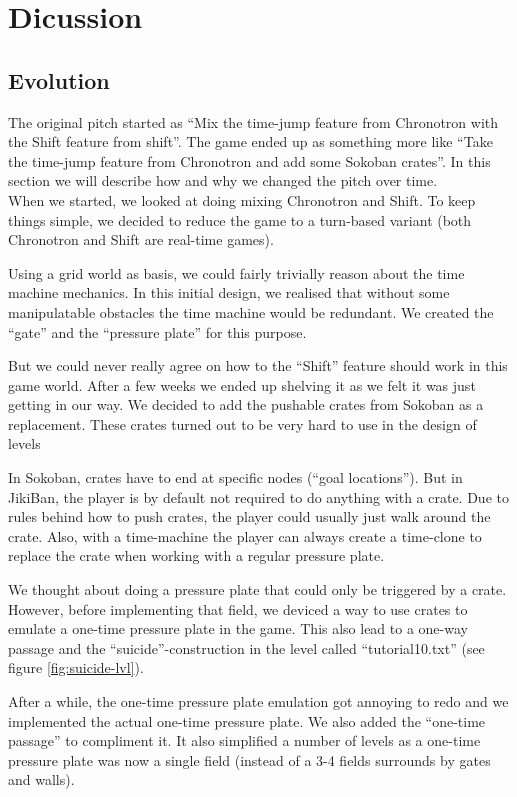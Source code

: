 \section{Dicussion}

\subsection{Evolution}
The original pitch started as ``Mix the time-jump feature from
Chronotron with the Shift feature from shift''.  The game ended up as
something more like ``Take the time-jump feature from Chronotron and
add some Sokoban crates''.  In this section we will describe how and why
we changed the pitch over time.\\


When we started, we looked at doing mixing Chronotron and Shift.  To
keep things simple, we decided to reduce the game to a turn-based
variant (both Chronotron and Shift are real-time games).

Using a grid world as basis, we could fairly trivially reason about
the time machine mechanics.  In this initial design, we realised that
without some manipulatable obstacles the time machine would be
redundant.  We created the ``gate'' and the ``pressure plate'' for
this purpose.

But we could never really agree on how to the ``Shift'' feature should
work in this game world.  After a few weeks we ended up shelving it as
we felt it was just getting in our way.  We decided to add the
pushable crates from Sokoban as a replacement.  These crates turned out
to be very hard to use in the design of levels

In Sokoban, crates have to end at specific nodes (``goal locations'').
But in JikiBan, the player is by default not required to do anything
with a crate.  Due to rules behind how to push crates, the player
could usually just walk around the crate.  Also, with a time-machine
the player can always create a time-clone to replace the crate when
working with a regular pressure plate.

We thought about doing a pressure plate that could only be triggered
by a crate.  However, before implementing that field, we deviced a way
to use crates to emulate a one-time pressure plate in the game.  This
also lead to a one-way passage and the ``suicide''-construction in the
level called ``tutorial10.txt'' (see figure \ref{fig:suicide-lvl}).

After a while, the one-time pressure plate emulation got annoying to
redo and we implemented the actual one-time pressure plate. We also
added the ``one-time passage'' to compliment it.  It also simplified a
number of levels as a one-time pressure plate was now a single field
(instead of a 3-4 fields surrounds by gates and walls).

